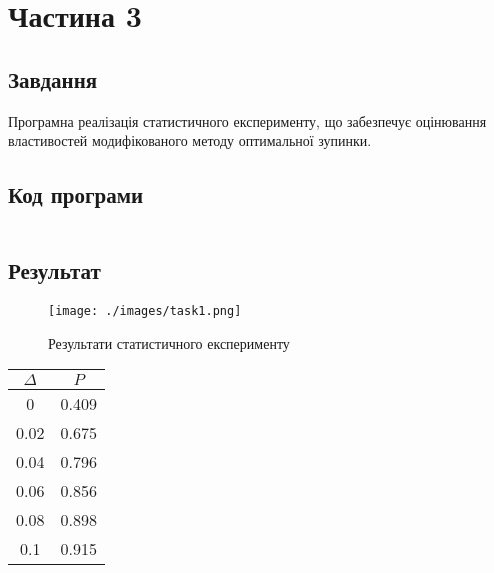 \section{Частина 3}
\label{sec:task3}

\subsection{Завдання}
\label{subsec:task3_task}

Програмна реалізація статистичного експерименту,
що забезпечує оцінювання властивостей модифікованого
методу оптимальної зупинки.

\subsection{Код програми}
\label{subsec:task3_code}
\inputminted{python}{../src/task1.py}

\subsection{Результат}
\label{subsec:task3_result}

\begin{figure}[!ht]
    \centering
    \texttt{[image: ./images/task1.png]}
    \caption{Результати статистичного експерименту}
    \label{fig:graphs}
\end{figure}

\begin{tabular}{|c|c|}
    \toprule
    $\Delta$ & $P$   \\

    \midrule
    0        & 0.409 \\
    \hline
    0.02     & 0.675 \\
    \hline
    0.04     & 0.796 \\
    \hline
    0.06     & 0.856 \\
    \hline
    0.08     & 0.898 \\
    \hline
    0.1      & 0.915 \\

    \bottomrule
\end{tabular}
